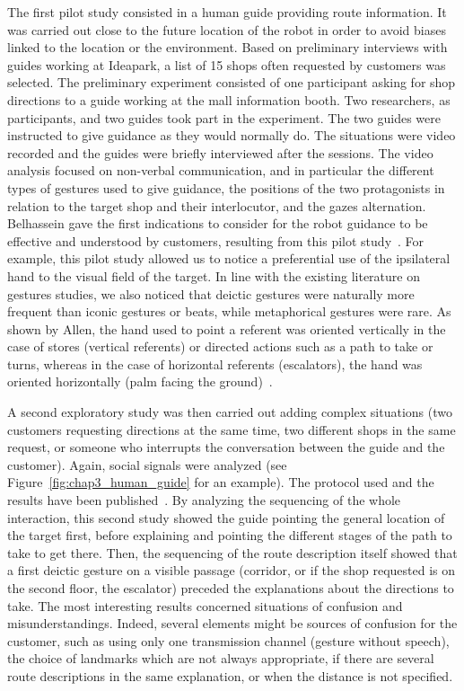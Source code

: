 \documentclass[a4paper,11pt,twoside]{StyleThese}
\begin{document}
The first pilot study consisted in a human guide providing route information. It was carried out close to the future location of the robot in order to avoid biases linked to the location or the environment. Based on preliminary interviews with guides working at Ideapark, a list of 15 shops often requested by customers was selected. The preliminary experiment consisted of one participant asking for shop directions to a guide working at the mall information booth. Two researchers, as participants, and two guides took part in the experiment. The two guides were instructed to give guidance as they would normally do. The situations were video recorded and the guides were briefly interviewed after the sessions. The video analysis focused on non-verbal communication, and in particular the different types of gestures used to give guidance, the positions of the two protagonists in relation to the target shop and their interlocutor, and the gazes alternation. Belhassein \etal{} gave the first indications to consider for the robot guidance to be effective and understood by customers, resulting from this pilot study~\cite{belhassein_2017_human}. For example, this pilot study allowed us to notice a preferential use of the ipsilateral hand to the visual field of the target. In line with the existing literature on gestures studies, we also noticed that deictic gestures were naturally more frequent than iconic gestures or beats, while metaphorical gestures were rare. As shown by Allen, the hand used to point a referent was oriented vertically in the case of stores (vertical referents) or directed actions such as a path to take or turns, whereas in the case of horizontal referents (\eg escalators), the hand was oriented horizontally (palm facing the ground)~\cite{allen_2003}.

A second exploratory study was then carried out adding complex situations (\eg two customers requesting directions at the same time, two different shops in the same request, or someone who interrupts the conversation between the guide and the customer). Again, social signals were analyzed (see Figure~\ref{fig:chap3_human_guide} for an example). The protocol used and the results have been published~\cite{heikkilae_2018_where,heikkilae_2019_should}. By analyzing the sequencing of the whole interaction, this second study showed the guide pointing the general location of the target first, before explaining and pointing the different stages of the path to take to get there. Then, the sequencing of the route description itself showed that a first deictic gesture on a visible passage (corridor, or if the shop requested is on the second floor, the escalator) preceded the explanations about the directions to take. The most interesting results concerned situations of confusion and misunderstandings. Indeed, several elements might be sources of confusion for the customer, such as using only one transmission channel (\eg gesture without speech), the choice of landmarks which are not always appropriate, if there are several route descriptions in the same explanation, or when the distance is not specified. 
\end{document}
